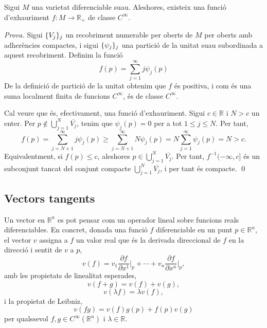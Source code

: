 \begin{prop}
    Sigui $M$ una varietat diferenciable suau. Aleshores, existeix una funció d'exhauriment $f:M\to\mathbb R_+$ de classe $C^\infty$.
\end{prop}
{
    \color{black} \textit{Prova.} 
    Sigui $\{V_j\}_j$ un recobriment numerable per oberts de $M$ per oberts amb adherències compactes, i sigui $\{\psi_j\}_j$ una partició de la unitat suau subordinada a aquest recobriment. Definim la funció
    \begin{equation*}
        f(p) = \sum_{j=1}^\infty j\psi_j(p)
    \end{equation*}
    De la definició de partició de la unitat obtenim que $f$ és positiva, i com és una suma localment finita de funcions $C^\infty$, és de classe $C^\infty$.

    Cal veure que és, efectivament, una funció d'exhauriment. Sigui $c\in\mathbb R$ i $N>c$ un enter. Per $p\not\in\bigcup_{j=1}^N \overline{V_j}$, tenim que $\psi_j(p)=0$ per a tot $1\le j\le N$. Per tant,
    \begin{equation*}
        f(p) = \sum_{j=N+1}^\infty j\psi_j(p) \ge \sum_{j=N+1}^\infty N\psi_j(p) =N\sum_{j=1}^\infty\psi_j(p) = N>c.
    \end{equation*}
    Equivalentment, si $f(p)\le c$, aleshores $p\in\bigcup_{j=1}^N \overline{V_j}$. Per tant, $f^{-1}(-\infty,c]$ és un subconjunt tancat del conjunt compacte $\bigcup_{j=1}^N \overline{V_j}$, i per tant és compacte.
    \qed
}



\subsection{Vectors tangents}
Un vector en $\mathbb R^n$ es pot pensar com un operador lineal sobre funcions reals diferenciables. En concret, donada una funció $f$ diferenciable en un punt $p\in\mathbb R^n$, el vector $v$ assigna a $f$ un valor real que és la derivada direccional de $f$ en la direcció i sentit de $v$ a $p$,
\begin{equation*}
    v(f) = v_1\frac{\partial f}{\partial x^1}\Big|_p + \cdots + v_n\frac{\partial f}{\partial x^n}\Big|_p,
\end{equation*}
amb les propietats de linealitat esperades,
\begin{equation*}
    v(f+g) = v(f) + v(g), 
\end{equation*}
\begin{equation*}
    v(\lambda f) = \lambda v(f),
\end{equation*}
i la propietat de Leibniz,
\begin{equation*}
    v(fg) = v(f)g(p) + f(p)v(g)
\end{equation*}
per qualssevol $f,g\in C^\infty(\mathbb R^n)$ i $\lambda\in\mathbb R$.

